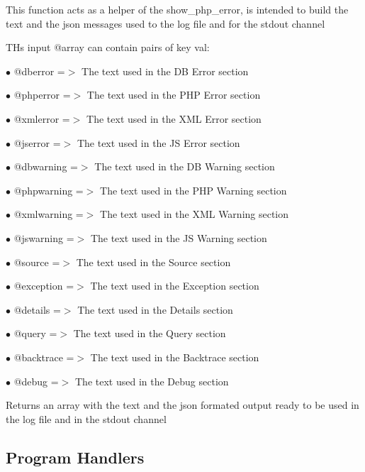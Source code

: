 \documentclass[a4paper]{book}
\begin{document}
This function acts as a helper of the show\_php\_error, is intended to build
the text and the json messages used to the log file and for the stdout channel

THs input @array can contain pairs of key val:

\begin{compactitem}
\item[\color{myblue}$\bullet$] @dberror    =$>$ The text used in the DB Error section
\item[\color{myblue}$\bullet$] @phperror   =$>$ The text used in the PHP Error section
\item[\color{myblue}$\bullet$] @xmlerror   =$>$ The text used in the XML Error section
\item[\color{myblue}$\bullet$] @jserror    =$>$ The text used in the JS Error section
\item[\color{myblue}$\bullet$] @dbwarning  =$>$ The text used in the DB Warning section
\item[\color{myblue}$\bullet$] @phpwarning =$>$ The text used in the PHP Warning section
\item[\color{myblue}$\bullet$] @xmlwarning =$>$ The text used in the XML Warning section
\item[\color{myblue}$\bullet$] @jswarning  =$>$ The text used in the JS Warning section
\item[\color{myblue}$\bullet$] @source     =$>$ The text used in the Source section
\item[\color{myblue}$\bullet$] @exception  =$>$ The text used in the Exception section
\item[\color{myblue}$\bullet$] @details    =$>$ The text used in the Details section
\item[\color{myblue}$\bullet$] @query      =$>$ The text used in the Query section
\item[\color{myblue}$\bullet$] @backtrace  =$>$ The text used in the Backtrace section
\item[\color{myblue}$\bullet$] @debug      =$>$ The text used in the Debug section
\end{compactitem}

Returns an array with the text and the json formated output ready to be used
in the log file and in the stdout channel

\hypertarget{toc102}{}
\subsection{Program Handlers}
\end{document}
